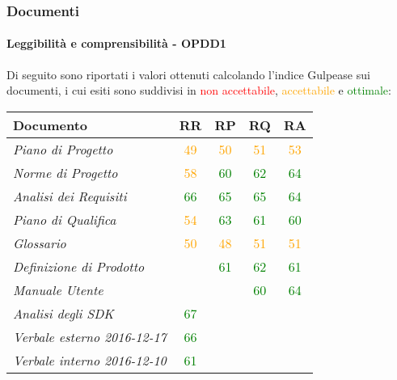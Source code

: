 \documentclass[PdQ.tex]{subfiles}
\begin{document}
	\subsubsection{Documenti}
		\paragraph{Leggibilità e comprensibilità - OPDD1}
				Di seguito sono riportati i valori ottenuti calcolando l'indice Gulpease sui documenti, i cui esiti sono suddivisi in \textcolor{red}{non accettabile}, \textcolor{orange}{accettabile} e \textcolor{green}{ottimale}:
				\begin{table}[H]
				\centering
				\begin{tabular}{l c c c c}
					\hline
					\rule[-0.3cm]{0cm}{0.8cm}
					\textbf{Documento} & \textbf{RR} & \textbf{RP} & \textbf{RQ} & \textbf{RA}\\
					\hline
					\rule[0cm]{0cm}{0.4cm}
					\textit{Piano di Progetto} & \textcolor{orange}{49} & \textcolor{orange}{50} & \textcolor{orange}{51} & \textcolor{orange}{53} \\
					\rule[0cm]{0cm}{0.4cm}
					\textit{Norme di Progetto}& \textcolor{orange}{58} & \textcolor{green}{60} & \textcolor{green}{62} & \textcolor{green}{64}\\
					\rule[0cm]{0cm}{0.4cm}
					\textit{Analisi dei Requisiti} & \textcolor{green}{66} & \textcolor{green}{65} & \textcolor{green}{65} & \textcolor{green}{64} \\
					\rule[0cm]{0cm}{0.4cm}
					\textit{Piano di Qualifica} & \textcolor{orange}{54} & \textcolor{green}{63} & \textcolor{green}{61} & \textcolor{green}{60} \\
					\rule[0cm]{0cm}{0.4cm}
					\textit{Glossario} & \textcolor{orange}{50} & \textcolor{orange}{48} & \textcolor{orange}{51} & \textcolor{orange}{51}\\
					\rule[0cm]{0cm}{0.4cm}
					\textit{Definizione di Prodotto} & & \textcolor{green}{61} & \textcolor{green}{62} & \textcolor{green}{61} \\
					\rule[0cm]{0cm}{0.4cm}
					\textit{Manuale Utente} & & & \textcolor{green}{60} & \textcolor{green}{64}\\
					\rule[0cm]{0cm}{0.4cm}
					\textit{Analisi degli SDK} & \textcolor{green}{67} & & & \\
					\rule[0cm]{0cm}{0.4cm}
					\textit{Verbale esterno 2016-12-17} & \textcolor{green}{66} & & &\\
					\rule[0cm]{0cm}{0.4cm}
					\textit{Verbale interno 2016-12-10} & \textcolor{green}{61} & & &\\

\end{tabular}
\end{table}
\end{document}
